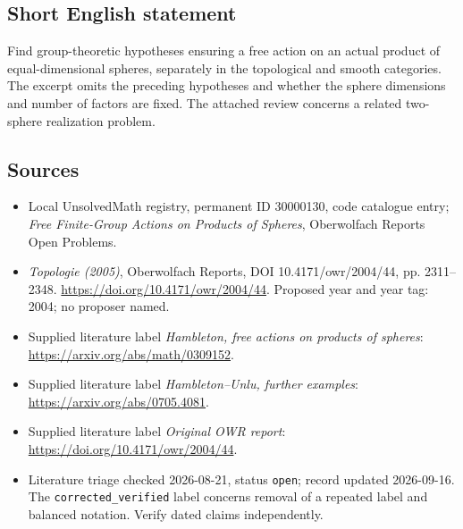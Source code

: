 \documentclass[11pt]{article}
\begin{document}
\subsection{Short English statement}
Find group-theoretic hypotheses ensuring a free action on an actual product of equal-dimensional spheres, separately in the topological and smooth categories. The excerpt omits the preceding hypotheses and whether the sphere dimensions and number of factors are fixed. The attached review concerns a related two-sphere realization problem.
\subsection{Sources}
\begin{itemize}\item Local UnsolvedMath registry, permanent ID 30000130, code catalogue entry; \emph{Free Finite-Group Actions on Products of Spheres}, Oberwolfach Reports Open Problems.\item \emph{Topologie (2005)}, Oberwolfach Reports, DOI 10.4171/owr/2004/44, pp. 2311--2348. \url{https://doi.org/10.4171/owr/2004/44}. Proposed year and year tag: 2004; no proposer named.\item Supplied literature label \emph{Hambleton, free actions on products of spheres}: \url{https://arxiv.org/abs/math/0309152}.\item Supplied literature label \emph{Hambleton--Unlu, further examples}: \url{https://arxiv.org/abs/0705.4081}.\item Supplied literature label \emph{Original OWR report}: \url{https://doi.org/10.4171/owr/2004/44}.\item Literature triage checked 2026-08-21, status \texttt{open}; record updated 2026-09-16. The \texttt{corrected\_verified} label concerns removal of a repeated label and balanced notation. Verify dated claims independently.\end{itemize}
\end{document}
